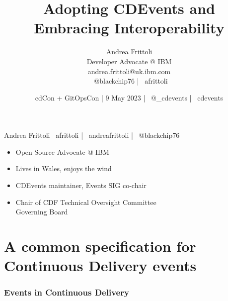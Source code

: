\documentclass[aspectratio=169,11pt,hyperref={colorlinks=true}]{beamer}
\title{Adopting CDEvents and Embracing Interoperability}
\date[9 May 2023]{cdCon + GitOpsCon | 9 May 2023 | \faTwitter ~@\_cdevents | \faGithub ~cdevents}
\author[Andrea Frittoli]{%
  Andrea Frittoli \\
  Developer Advocate @ IBM\\
  andrea.frittoli@uk.ibm.com \\
  \faTwitter ~@blackchip76 | \faGithub ~afrittoli\\
}
\begin{document}
\begin{frame}
\titlepage{}
\end{frame}


\begin{speakerframe}{Andrea Frittoli}%
  {%
  \faGithub ~afrittoli | \faLinkedin ~andreafrittoli | \faTwitter ~@blackchip76
  }%
  {%
  \begin{itemize}
    \item{Open Source Advocate @ IBM}
    \item{Lives in Wales, enjoys the wind}
    \item{CDEvents maintainer, Events SIG co-chair}
    \item{Chair of CDF Technical Oversight Committee \\ Governing Board}
  \end{itemize}
  }%
\end{speakerframe}

\section[CDEvents]{A common specification for Continuous Delivery events}
\begin{sectionwithpicmediumcentral}{}
\end{sectionwithpicmediumcentral}

\begin{blackframe}
  \frametitle{Events in Continuous Delivery}
\end{blackframe}
\end{document}
